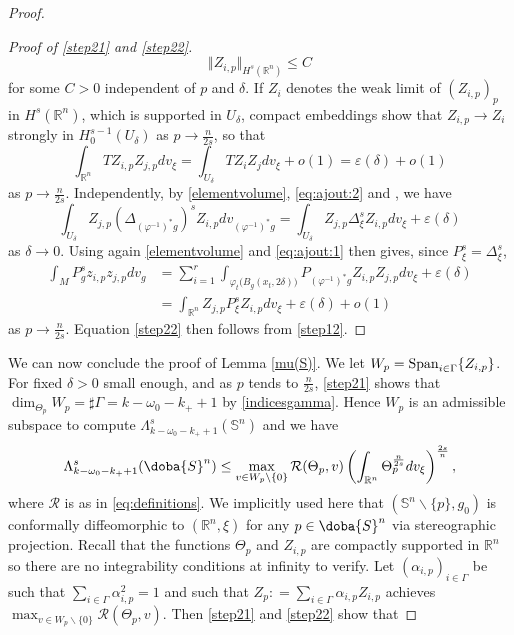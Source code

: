 \documentclass[10pt]{amsart}
\numberwithin{equation}{section}
\newcommand{\R}{\mathbb{R}}
\def\al{{\alpha}}
\def\La{{\Lambda}}
\def\de{{\delta}}
\def\phi{{\varphi}}
\gdef\mS{\doba{S}}
\def\span{{\mathop{\rm Span}}}
\newcommand{\ve}{\varepsilon}
\newcommand{\vp}{\varphi}
\theoremstyle{plain}
\theoremstyle{remark}
\begin{document}
\begin{proof}
\begin{proof}[Proof of \eqref{step21} and \eqref{step22}]
\begin{equation} \label{eq:ajout:2}
 \Vert Z_{i,p} \Vert_{H^s(\R^n)} \le C 
 \end{equation}
for some $C >0$ independent of $p$ and $\delta$. If $Z_i$ denotes the weak limit of $(Z_{i,p})_p$ in $H^s(\R^n)$, which is supported in $U_\delta$, compact embeddings show that 
$Z_{i,p} \to Z_i$ strongly in $H^{s-1}_0(U_\delta)$ as $p \to \frac{n}{2s}$, so that 
$$ \int_{\R^n} T Z_{i,p} Z_{j,p} dv_\xi =  \int_{U_\delta} T Z_{i} Z_{j} dv_\xi + o(1)  = \ve(\delta) + o(1)$$
as $p \to \frac{n}{2s}$. Independently, by \eqref{elementvolume}, \eqref{eq:ajout:2} and \cite[Lemma 9.1]{Mazumdar1}, we have 
$$ \int_{U_\delta} Z_{j,p}  (\Delta_{(\vp^{-1})^*g} )^s Z_{i,p} dv_{(\vp^{-1})^*g} = \int_{U_\delta} Z_{j,p}  \Delta_{\xi}^s Z_{i,p} dv_\xi + \ve(\delta) $$
as $\delta \to 0$. Using again \eqref{elementvolume} and \eqref{eq:ajout:1} then gives, since $P_\xi^s = \Delta_\xi^s$,
$$ \begin{aligned}
\int_M P_g^sz_{i,p} z_{j,p} dv_g & =  \sum_{i=1}^r \int_{\phi_t\big( B_g(x_t,2 \de) \big)} P_{(\vp^{-1})^*g} Z_{i,p} Z_{j,p} dv_{\xi} + \ve(\delta) \\
& =  \int_{\R^n}  Z_{j,p}P_\xi^s Z_{i,p}  dv_\xi+  \ve(\delta) + o(1) 
\end{aligned} $$
as $p \to \frac{n}{2s}$. Equation \eqref{step22} then follows from \eqref{step12}.
 \end{proof}
We can now conclude the proof of Lemma \ref{mu(S)}. We let $W_p = \span_{i \in \Gamma}  \{ Z_{i,p}\}$. For fixed $\delta >0$ small enough, and as $p$ tends to $\frac{n}{2s}$, \eqref{step21} shows that $\dim_{\Theta_p} W_p =  \sharp \Gamma =  k-\omega_0 -k_++1$ by \eqref{indicesgamma}. Hence $W_p$ is an admissible subspace to compute $\Lambda_{k-\omega_0 -k_++1}^s (\mathbb{S}^n)$ and we have  
\begin{equation} \label{step31}
\La_{k-\omega_0-k_++1}^s(\mS^n) \leq \max_{v \in W_p \backslash \{0\}} \mathcal{R}(\Theta_p,v) \left(\int_{\R^n} \Theta_p^{\frac{n}{2s}} dv_\xi \right)^{\frac{2s}{n}},
\end{equation}
where $\mathcal{R}$ is as in \eqref{eq:definitions}. We implicitly used here that $(\mathbb{S}^n \backslash \{p\}, g_0)$ is conformally diffeomorphic to $(\R^n, \xi)$ for any $p \in \mS^n$ via stereographic projection. Recall that the functions $\Theta_p$ and $Z_{i,p}$ are compactly supported in $\R^n$ so there are no integrability conditions at infinity to verify.  Let $(\al_{i,p})_{ i \in \Gamma}$ be such that $\sum_{i \in \Gamma} \al_{i,p}^2=1$ and such that $Z_p: = \sum_{i \in \Gamma} \al_{i,p} Z_{i,p}$ achieves $\max_{v \in W_p \backslash \{0\}} \mathcal{R}(\Theta_p,v)$. Then \eqref{step21} and \eqref{step22} show that 

\end{proof}
\end{document}
